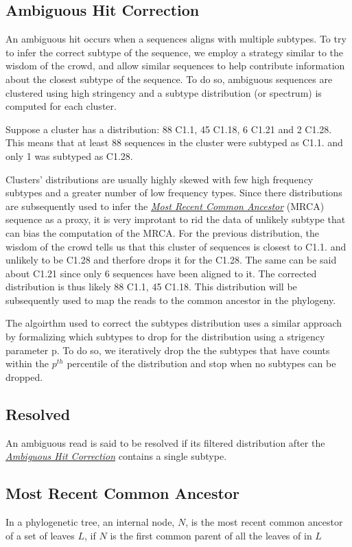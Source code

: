 \documentclass[letterpaper,10pt,english]{sphinxmanual}
\begin{document}
\subsection{Ambiguous Hit Correction}
\label{defs:multiple-hits}\label{defs:ambiguous-hit-correction}
An ambiguous hit occurs when a sequences aligns with multiple subtypes. To try to infer the correct subtype of
the sequence, we employ a strategy similar to the wisdom of the crowd, and allow similar sequences to help contribute
information about the closest subtype of the sequence. To do so, ambiguous sequences are clustered using high stringency
and a subtype distribution (or spectrum) is computed for each cluster.

Suppose a cluster has a distribution:
88 C1.1, 45 C1.18, 6 C1.21 and 2 C1.28. This means that at least 88 sequences in the cluster were subtyped as C1.1. and only 1
was subtyped as C1.28.

Clusters' distributions are usually highly skewed with few high
frequency subtypes and a greater number of low frequency types.  Since
there distributions are subsequently used to infer the {\hyperref[defs:mrca]{\emph{Most Recent Common Ancestor}}}
(MRCA) sequence as a proxy, it is very improtant to rid the data of
unlikely subtype that can bias the computation of the MRCA. For the
previous distribution, the wisdom of the crowd tells us that this
cluster of sequences is closest to C1.1. and unlikely to be C1.28 and
therfore drops it for the C1.28. The same can be said about C1.21
since only 6 sequences have been aligned to it.  The corrected
distribution is thus likely 88 C1.1, 45 C1.18. This distribution will
be subsequently used to map the reads to the common ancestor in the
phylogeny.

The algoirthm used to correct the subtypes distribution uses a similar
approach by formalizing which subtypes to drop for the distribution
using a strigency parameter p. To do so, we iteratively drop the
the subtypes that have counts within the \(p^{th}\) percentile of the distribution and stop
when no subtypes can be dropped.


\subsection{Resolved}
\label{defs:resolved}\label{defs:id9}
An ambiguous read is said to be resolved if its filtered distribution after the {\hyperref[defs:multiple-hits]{\emph{Ambiguous Hit Correction}}} contains a single subtype.


\subsection{Most Recent Common Ancestor}
\label{defs:mrca}\label{defs:most-recent-common-ancestor}
In a phylogenetic tree, an internal node, \(N\), is the most recent common ancestor of a set of leaves \(L\), if \(N\) is the first common parent
of all the leaves of in \(L\)
\end{document}
